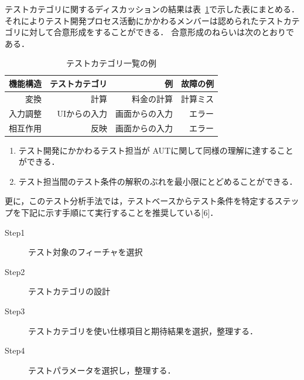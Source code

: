 \documentclass[a4paper,12pt]{jreport}
\begin{document}
テストカテゴリに関するディスカッションの結果は表~\ref{tbl:D-3-tbl1}で示した表にまとめる．それによりテスト開発プロセス活動にかかわるメンバーは認められたテストカテゴリに対して合意形成をすることができる． 合意形成のねらいは次のとおりである．

\begin{table}[t]
\caption{テストカテゴリ一覧の例}
\label{tbl:D-3-tbl1}
\begin{center}
\begin{tabular}{r|r|r|r}
機能構造&テストカテゴリ&例&故障の例\\
\hline
\hline
変換&計算&料金の計算&計算ミス\\
\hline
入力調整&UIからの入力&画面からの入力&エラー\\
\hline
相互作用&反映&画面からの入力&エラー\\
    \hline
\end{tabular}%
\end{center}
\end{table}




\begin{enumerate}
\item テスト開発にかかわるテスト担当が AUTに関して同様の理解に達することができる．
\item テスト担当間のテスト条件の解釈のぶれを最小限にとどめることができる．
\end{enumerate}
更に，このテスト分析手法では，テストベースからテスト条件を特定するステップを下記に示す手順にて実行することを推奨している[6]．

\begin{description}
\item[Step1] テスト対象のフィーチャを選択
\item[Step2] テストカテゴリの設計
\item[Step3] テストカテゴリを使い仕様項目と期待結果を選択，整理する．
\item[Step4] テストパラメータを選択し，整理する．
\end{description}
\end{document}
